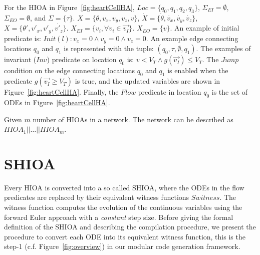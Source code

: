 For the \ac{HIOA} in Figure~\ref{fig:heartCellHA},
$Loc=\{q_{0},q_{1},q_{2},q_{3}\}$, $\Sigma_{EI} = \emptyset$,
$\Sigma_{EO}=\emptyset$, and
$\Sigma=\{\tau\}$. $X=\{\theta,v_{x},v_{y},v_{z},v\}$,
\mbox{$\dot{X}=\{\dot{\theta},\dot{v_{x}},\dot{v_{y}},\dot{v_{z}}\}$},
\mbox{$X=\{\theta',{v'_{x}},{v'_{y}},\dot{v'_{z}}\}$}.
$X_{EI}=\{v_{i}, \forall v_{i} \in \vec{v_{I}}\}$.  $X_{EO}=\{v\}$. An
example of initial predicate is:
$Init(l): v_{x}=0 \wedge v_{y}=0 \wedge v_{z}=0$. An example edge
connecting locations $q_{0}$ and $q_{1}$ is represented with the tuple:
$(q_{0},\tau,\emptyset,q_{1})$. The examples of invariant ($Inv$)
predicate on location $q_{0}$ is:
$v < V_{T} \wedge g(\vec{v_{I}}) \leq V_{T}$. The $Jump$ condition on
the edge connecting locations $q_{0}$ and $q_{1}$ is enabled when the
predicate \mbox{$g(\vec{v_{I}} \geq V_{T})$} is true, and the updated
variables are shown in Figure~\ref{fig:heartCellHA}. Finally, the $Flow$
predicate in location $q_{0}$ is the set of ODEs in
Figure~\ref{fig:heartCellHA}.



{\color{red} Given $m$ number of \acp{HIOA} in a network.  The network
  can be described as $HIOA_1 || \dots || HIOA_m$.}


\section{\acf{SHIOA}}
\label{sec:SHA}

Every \ac{HIOA} is converted into a so called \ac{SHIOA}, where the ODEs
in the flow predicates are replaced by their equivalent witness
functions $Switness$. The witness function computes the evolution of the
continuous variables using the forward Euler approach with a
\emph{constant} step size. Before giving the formal definition of the
\ac{SHIOA} and describing the compilation procedure, we present the
procedure to convert each ODE into its equivalent witness function, this
is the step-1 (c.f. Figure~\ref{fig:overview}) in our modular code
generation framework.

